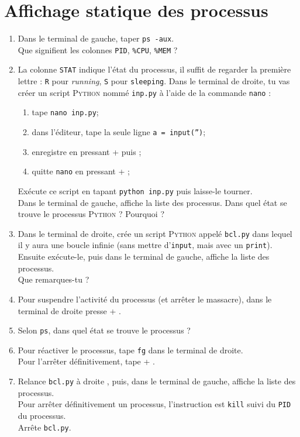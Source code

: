 \documentclass[a4paper,12pt,french]{book}
\begin{document}
\section*{Affichage statique des processus}
\begin{enumerate}
    \item Dans le terminal de gauche, taper \texttt{ps -aux}.\\
    Que signifient les colonnes \texttt{PID}, \texttt{\%CPU}, \texttt{\%MEM} ?
    \item La colonne \texttt{STAT} indique l'état du processus, il suffit de regarder la première lettre : \texttt{R} pour \textit{running}, \texttt{S} pour \texttt{sleeping}.
        Dans le terminal de droite, tu vas créer un script \textsc{Python} nommé \texttt{inp.py} à l'aide de la commande \texttt{nano} :
        \begin{enumerate}[--]
        	\item tape \texttt{nano inp.py};
            \item dans l'éditeur, tape la seule ligne \texttt{a = input('')};
            \item enregistre en pressant  +  puis ;
            \item quitte \texttt{nano} en pressant  + ;
        \end{enumerate}
        Exécute ce script en tapant \texttt{python inp.py} puis laisse-le tourner.\\
        Dans le terminal de gauche, affiche la liste des processus. Dans quel état se trouve le processus \textsc{Python} ? Pourquoi ?
    \item Dans le terminal de droite, crée un script \textsc{Python} appelé \texttt{bcl.py} dans lequel il y aura une boucle infinie (sans mettre d'\texttt{input}, mais avec un \texttt{print}).\\
        Ensuite exécute-le, puis dans le terminal de gauche, affiche la liste des processus.\\
        Que remarques-tu ?
    \item Pour suspendre l'activité du processus (et arrêter le massacre), dans le terminal de droite presse  + .
    \item Selon \texttt{ps}, dans quel état se trouve le processus ?
    \item Pour réactiver le processus, tape \texttt{fg} dans le terminal de droite.\\
            Pour l'arrêter définitivement, tape  + .
    \item Relance \texttt{bcl.py} à droite , puis, dans le terminal de gauche, affiche la liste des processus.\\
          Pour arrêter définitivement un processus, l'instruction est \texttt{kill} suivi du \texttt{PID} du processus.\\
          Arrête \texttt{bcl.py}.
\end{enumerate}
\end{document}
